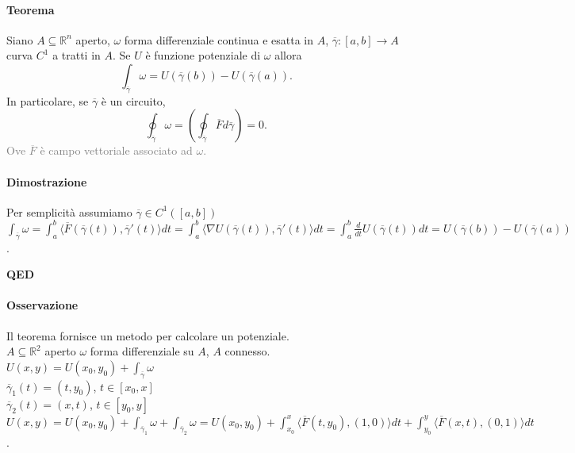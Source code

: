 \documentclass{article}
\newcommand{\R}{\mathbb{R}}
\begin{document}
\paragraph{{Teorema}}
Siano $A \subseteq \R^n$ aperto, $\omega$ forma differenziale continua e esatta in $A$, $\overline{\gamma}:[a,b]\rightarrow A$ curva $C^1$ a tratti in $A$. Se $U$ è funzione potenziale di $\omega$ allora
\begin{equation*}
    \int_{\overline{\gamma}}\omega =U(\overline{\gamma}(b))-U(\overline{\gamma}(a)).
\end{equation*}
In particolare, se $\overline{\gamma}$ è un circuito,
\begin{equation*}
    \oint_{\overline{\gamma}}\omega = \left( \oint_{\overline{\gamma}}\overline{F} d\overline{\gamma} \right)=0.
\end{equation*}
\textcolor{grey}{Ove $\overline{F}$ è campo vettoriale associato ad $\omega$.}

\paragraph{{Dimostrazione}}
Per semplicità assumiamo $\overline{\gamma}\in C^1([a,b])$\\
$\int_{\overline{\gamma}}\omega=\int_a^b \langle \overline{F}(\overline{\gamma}(t)), \overline{\gamma}'(t) \rangle dt = \int_a^b \langle \nabla U(\overline{\gamma}(t)),\overline{\gamma}'(t) \rangle dt = \int_a^b \frac{d}{dt}U(\overline{\gamma}(t))dt=U(\overline{\gamma}(b))-U(\overline{\gamma}(a))$.
\begin{flushright}
    \textbf{QED}
\end{flushright}

\paragraph{{Osservazione}}
Il teorema fornisce un metodo per calcolare un potenziale.\\
$A \subseteq \R^2$ aperto $\omega$ forma differenziale su $A$, $A$ connesso.\\
$U(x,y)=U(x_0,y_0)+\int_{\overline{\gamma}}\omega$\\
$\overline{\gamma}_1(t)=(t,y_0)$, $t \in [x_0,x]$\\
$\overline{\gamma}_2(t)=(x,t)$, $t \in [y_0,y]$\\
$U(x,y)=U(x_0,y_0)+\int_{\overline{\gamma}_1}\omega + \int_{\overline{\gamma}_2}\omega= U(x_0,y_0)+\int_{x_0}^x\langle \overline{F}(t,y_0),(1,0) \rangle dt + \int_{y_0}^y \langle \overline{F}(x,t),(0,1)\rangle dt$.
\end{document}
